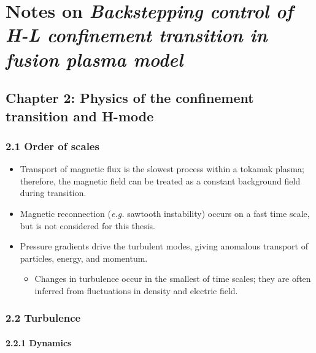 \documentclass[]{article}
\date{}
\providecommand{\tightlist}{%
  \setlength{\itemsep}{0pt}\setlength{\parskip}{0pt}}
\let\oldparagraph\paragraph
\renewcommand{\paragraph}[1]{\oldparagraph{#1}\mbox{}}
\begin{document}
\section{\texorpdfstring{Notes on \emph{Backstepping control of H-L
confinement transition in fusion plasma
model}}{Notes on Backstepping control of H-L confinement transition in fusion plasma model}}\label{notes-on-backstepping-control-of-h-l-confinement-transition-in-fusion-plasma-model}

\subsection{Chapter 2: Physics of the confinement transition and
H-mode}\label{chapter-2-physics-of-the-confinement-transition-and-h-mode}

\subsubsection{2.1 Order of scales}\label{order-of-scales}

\begin{itemize}
\item
  Transport of magnetic flux is the slowest process within a tokamak
  plasma; therefore, the magnetic field can be treated as a constant
  background field during transition.
\item
  Magnetic reconnection (\emph{e.g.} sawtooth instability) occurs on a
  fast time scale, but is not considered for this thesis.
\item
  Pressure gradients drive the turbulent modes, giving anomalous
  transport of particles, energy, and momentum.

  \begin{itemize}
  \tightlist
  \item
    Changes in turbulence occur in the smallest of time scales; they are
    often inferred from fluctuations in density and electric field.
  \end{itemize}
\end{itemize}

\subsubsection{2.2 Turbulence}\label{turbulence}

\paragraph{2.2.1 Dynamics}\label{dynamics}
\end{document}
